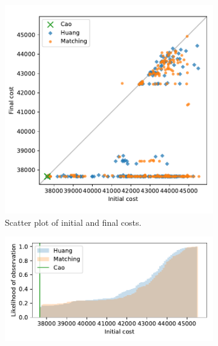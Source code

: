 \documentclass[11pt]{article}
\begin{document}
\begin{figure}
    \begin{subfigure}{.5\textwidth}
        \includegraphics[width=\linewidth]{Fig6a.pdf}
        \caption{Scatter plot of initial and final costs.}
    \end{subfigure}
    \hfill%
    \begin{subfigure}{.5\textwidth}
        \includegraphics[width=\linewidth]{Fig6b1.pdf}


\end{subfigure}
\end{figure}
\end{document}
